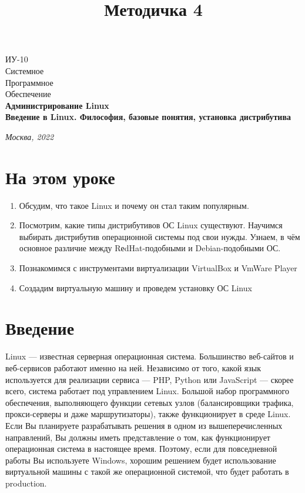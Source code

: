 \documentclass[14pt, a4paper]{article}
\title{Методичка 4}
\begin{document}
\begin{titlepage}
    \topmargin=216pt
    \newpage
    \hangindent=0.7cm
    \huge ИУ-10\\
    Системное\\
    Программное\\
    Обеспечение\\
    \textbf{Администрирование Linux\\ 
    Введение в Linux. Философия, базовые
понятия, установка дистрибутива}

    \vspace{10cm}

    \begin{center}
        \small\textit{Москва, 2022}
    \end{center}
\end{titlepage}

\tableofcontents
\section*{На этом уроке}
\begin{enumerate}
    \item Обсудим, что такое Linux и почему он стал таким популярным.
    \item Посмотрим, какие типы дистрибутивов ОС Linux существуют. Научимся выбирать дистрибутив
    операционной системы под свои нужды. Узнаем, в чём основное различие между
    RеdHat-подобными и Debian-подобными ОС.
    \item Познакомимся с инструментами виртуализации VirtualBox и VmWare Player
    \item Создадим виртуальную машину и проведем установку ОС Linux
\end{enumerate}
\newpage





\section*{Введение}
Linux — известная серверная операционная система. Большинство веб-сайтов и веб-сервисов
работают именно на ней. Независимо от того, какой язык используется для реализации сервиса —
PHP, Python или JavaScript — скорее всего, система работает под управлением Linux. Большой набор
программного обеспечения, выполняющего функции сетевых узлов (балансировщики трафика,
прокси-серверы и даже маршрутизаторы), также функционирует в среде Linux. Если Вы планируете
разрабатывать решения в одном из вышеперечисленных направлений, Вы должны иметь
представление о том, как функционирует операционная система в настоящее время. Поэтому, если
для повседневной работы Вы используете Windows, хорошим решением будет использование
виртуальной машины с такой же операционной системой, что будет работать в production.
\end{document}
